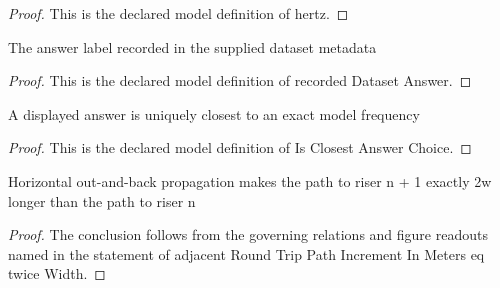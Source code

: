 \begin{proof}
  This is the declared model definition of hertz.
\end{proof}
\begin{definition}
  \label{def:physics:phyx-mini-0310:phyxminiproblems-problemphyxmini0310-recordeddatasetanswer}
  The answer label recorded in the supplied dataset metadata
\end{definition}
\begin{proof}
  This is the declared model definition of recorded Dataset Answer.
\end{proof}
\begin{definition}
  \label{def:physics:phyx-mini-0310:phyxminiproblems-problemphyxmini0310-isclosestanswerchoice}
  A displayed answer is uniquely closest to an exact model frequency
\end{definition}
\begin{proof}
  This is the declared model definition of Is Closest Answer Choice.
\end{proof}
\begin{lemma}
  \label{lem:physics:phyx-mini-0310:phyxminiproblems-problemphyxmini0310-adjacentroundtrippathincrementinmeters-eq-twicewidth}
  Horizontal out-and-back propagation makes the path to riser n + 1 exactly 2w longer than the path to riser n
\end{lemma}
\begin{proof}
  The conclusion follows from the governing relations and figure readouts named in the statement of adjacent Round Trip Path Increment In Meters eq twice Width.
\end{proof}
